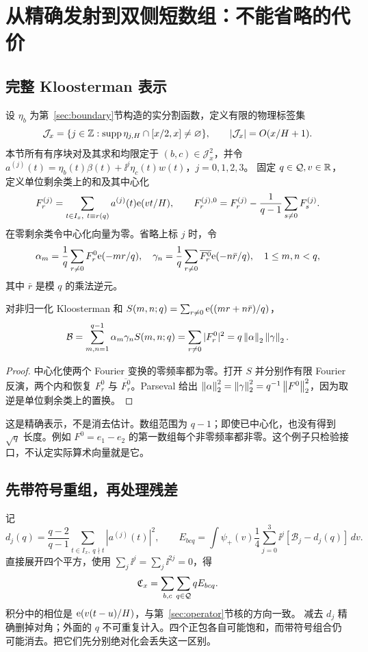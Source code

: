 \section{从精确发射到双侧短数组：不能省略的代价}\label{sec:emitter}
\subsection{完整 Kloosterman 表示}
设 $\eta_b$ 为第~\ref{sec:boundary}节构造的实分割函数，定义有限的物理标签集
\[
\mathcal J_x=\{j\in\mathbb Z:\operatorname{supp}\eta_{j,H}\cap[x/2,x]\ne\varnothing\},
\qquad |\mathcal J_x|=O(x/H+1).
\]
本节所有有序块对及其求和均限定于 $(b,c)\in\mathcal J_x^2$，并令
$a^{(j)}(t)=\eta_b(t)\beta(t)+\ii^j\eta_c(t)w(t)$，$j=0,1,2,3$。
固定 $q\in\mathcal Q,v\in\mathbb R$，定义单位剩余类上的和及其中心化
\[
F_r^{(j)}=\sum_{t\in I_x,\ t\equiv r(q)}a^{(j)}(t)\mathrm e(vt/H),\qquad
F_r^{(j),0}=F_r^{(j)}-\frac1{q-1}\sum_{s\ne0}F_s^{(j)}.
\]
在零剩余类令中心化向量为零。省略上标 $j$ 时，令
\[
\alpha_m=\frac1q\sum_{r\ne0}F_r^0\mathrm e(-mr/q),\quad
\gamma_n=\frac1q\sum_{r\ne0}\overline{F_r^0}\mathrm e(-n\bar r/q),\quad 1\le m,n<q,
\]
其中 $\bar r$ 是模 $q$ 的乘法逆元。
\begin{proposition}[发射恒等式与饱和]\label{prop:emitter}
对非归一化 Kloosterman 和 $S(m,n;q)=\sum_{r\ne0}\mathrm e((mr+n\bar r)/q)$，
\[
\mathcal B=\sum_{m,n=1}^{q-1}\alpha_m\gamma_nS(m,n;q)
=\sum_{r\ne0}|F_r^0|^2
=q\left\|\alpha\right\|_2\left\|\gamma\right\|_2.
\]
\end{proposition}
\begin{proof}
中心化使两个 Fourier 变换的零频率都为零。打开 $S$ 并分别作有限 Fourier 反演，两个内和恢复 $F_r^0$ 与 $\overline{F_r^0}$。Parseval 给出
$\left\|\alpha\right\|_2^2=\left\|\gamma\right\|_2^2=q^{-1}\left\|F^0\right\|_2^2$，因为取逆是单位剩余类上的置换。
\end{proof}
这是精确表示，不是消去估计。数组范围为 $q-1$；即使已中心化，也没有得到 $\sqrt q$ 长度。例如 $F^0=e_1-e_2$ 的第一数组每个非零频率都非零。这个例子只检验接口，不认定实际算术向量就是它。

\subsection{先带符号重组，再处理残差}
记
\[
d_j(q)=\frac{q-2}{q-1}\sum_{t\in I_x,\ q\nmid t}|a^{(j)}(t)|^2,\qquad
E_{bcq}=\int\psi_+(v)\frac14\sum_{j=0}^3\ii^j[\mathcal B_j-d_j(q)]\,dv.
\]
直接展开四个平方，使用 $\sum_j\ii^j=\sum_j\ii^{2j}=0$，得
\begin{equation}
\mathfrak C_x=\sum_{b,c}\sum_{q\in\mathcal Q}qE_{bcq}.\label{eq:polarreturn}
\end{equation}
积分中的相位是 $\mathrm e(v(t-u)/H)$，与第~\ref{sec:operator}节核的方向一致。
减去 $d_j$ 精确删掉对角；外面的 $q$ 不可重复计入。四个正包各自可能饱和，而带符号组合仍可能消去。把它们先分别绝对化会丢失这一区别。

